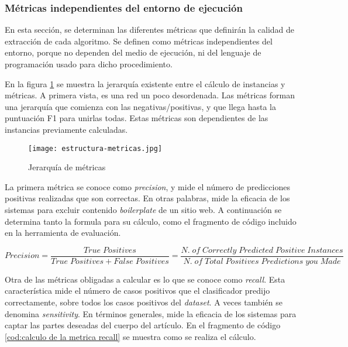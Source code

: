 \subsubsection{Métricas independientes del entorno de ejecución}
\label{subsubsec:metricas independientes del entorno de ejecucion}

En esta sección, se determinan las diferentes métricas que definirán la calidad de extracción de cada 
algoritmo. Se definen como métricas independientes del entorno, porque no dependen del medio de ejecución, 
ni del lenguaje de programación usado para dicho procedimiento.

En la figura \ref{img:jerarquia de metricas} se muestra la jerarquía existente entre el cálculo de instancias
y métricas. A primera vista, es una red un poco desordenada. Las métricas forman una jerarquía que comienza
con las negativas/positivas, y que llega hasta la puntuación F1 para unirlas todas. Estas métricas son 
dependientes de las instancias previamente calculadas.

\begin{figure}[tphb]
  \centering
  \texttt{[image: estructura-metricas.jpg]}
  \caption{Jerarquía de métricas}
  \label{img:jerarquia de metricas}
\end{figure}

La primera métrica se conoce como \emph{precision}, y mide el número de predicciones positivas realizadas
que son correctas. En otras palabras, mide la eficacia de los sistemas para excluir contenido
\emph{boilerplate} de un sitio web. A continuación se determina tanto la formula para su cálculo, como el
fragmento de código incluido en la herramienta de evaluación.

\begin{equation*}
  Precision = \frac{True\;Positives}{True\;Positives + False\;Positives} = 
  \frac{N.\;of\;Correctly\;Predicted\;Positive\;Instances}{N.\;of\;Total\;Positives\;Predictions\;you\;Made}
\end{equation*}

\begin{codefloat}
  
  \caption{Cálculo de la métrica \emph{precision}}
  \label{cod:calculo de la metrica precision}
\end{codefloat}

Otra de las métricas obligadas a calcular es lo que se conoce como \emph{recall}. Esta característica mide
el número de casos positivos que el clasificador predijo correctamente, sobre todos los casos positivos del
\emph{dataset}. A veces también se denomina \emph{sensitivity}. En términos generales, mide la eficacia de
los sistemas para captar las partes deseadas del cuerpo del artículo. En el fragmento de código
\ref{cod:calculo de la metrica recall} se muestra como se realiza el cálculo.

